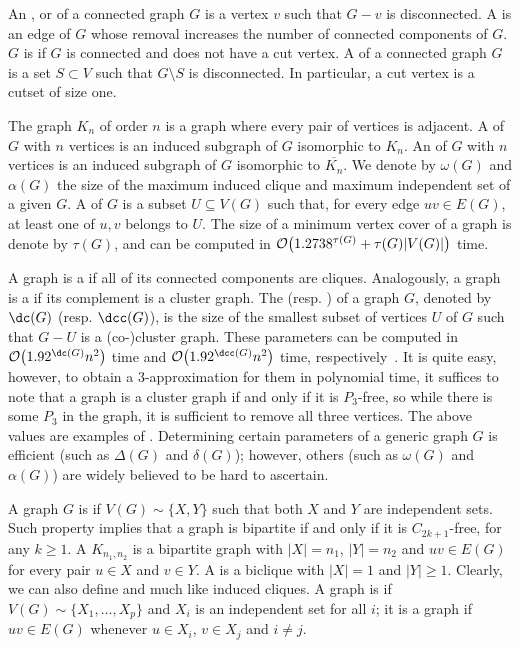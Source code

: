 An ,  or  of a connected graph $G$ is a vertex $v$ such that $G - v$ is disconnected.
A  is an edge of $G$ whose removal increases the number of connected components of $G$.
$G$ is  if $G$ is connected and does not have a cut vertex.
A  of a connected graph $G$ is a set $S \subset V$ such that $G \setminus S$ is disconnected.
In particular, a cut vertex is a cutset of size one.

The  graph $K_n$ of order $n$ is a graph where every pair of vertices is adjacent.
A  of $G$ with $n$ vertices is an induced subgraph of $G$ isomorphic to $K_n$.
An  of $G$ with $n$ vertices is an induced subgraph of $G$ isomorphic to $\overline{K_n}$.
We denote by $\omega(G)$ and $\alpha(G)$ the size of the maximum induced clique and maximum independent set of a given $G$.
A  of $G$ is a subset $U \subseteq V(G)$ such that, for every edge $uv \in E(G)$, at least one of $u,v$ belongs to $U$.
The size of a minimum vertex cover of a graph is denote by $\tau(G)$, and can be computed in $\mathcal{O}\!\left(1.2738^{\tau(G)} + \tau(G)|V(G)|\right)$ time.

A graph is a  if all of its connected components are cliques.
Analogously, a graph is a  if its complement is a cluster graph.
The  (resp. ) of a graph $G$, denoted by $\dc(G)$ (resp. $\dcc(G)$), is the size of the smallest subset of vertices $U$ of $G$ such that $G - U$ is a (co-)cluster graph.
These parameters can be computed in $\bigO{1.92^{\dc( G )}n^2 }$
time and $\bigO{1.92^{\dcc( G )}n^2 }$ time, respectively~\citep{branching-cluster}.
It is quite easy, however, to obtain a 3-approximation for them in polynomial time, it suffices to note that a graph is a cluster graph if and only if it is $P_3$-free, so while there is some $P_3$ in the graph, it is sufficient to remove all three vertices.
The above values are examples of .
Determining certain parameters of a generic graph $G$ is efficient (such as $\Delta(G)$ and $\delta(G)$); however, others (such as $\omega(G)$ and $\alpha(G)$) are widely believed to be hard to ascertain.

A graph $G$ is  if $V(G) \sim \{X, Y\}$ such that both $X$ and $Y$ are independent sets.
Such property implies that a graph is bipartite if and only if it is $C_{2k+1}$-free, for any $k \geq 1$.
A  $K_{n_1,n_2}$ is a bipartite graph with $|X| = n_1$, $|Y| = n_2$ and $uv \in E(G)$ for every pair $u \in X$ and $v \in Y$.
A  is a biclique with $|X| = 1$ and $|Y| \geq 1$.
Clearly, we can also define  and  much like induced cliques.
A graph is  if $V(G) \sim \{X_1, \dots,  X_p\}$ and $X_i$ is an independent set for all $i$; it is a  graph if $uv \in E(G)$ whenever $u \in X_i$, $v \in X_j$ and $i \neq j$.

